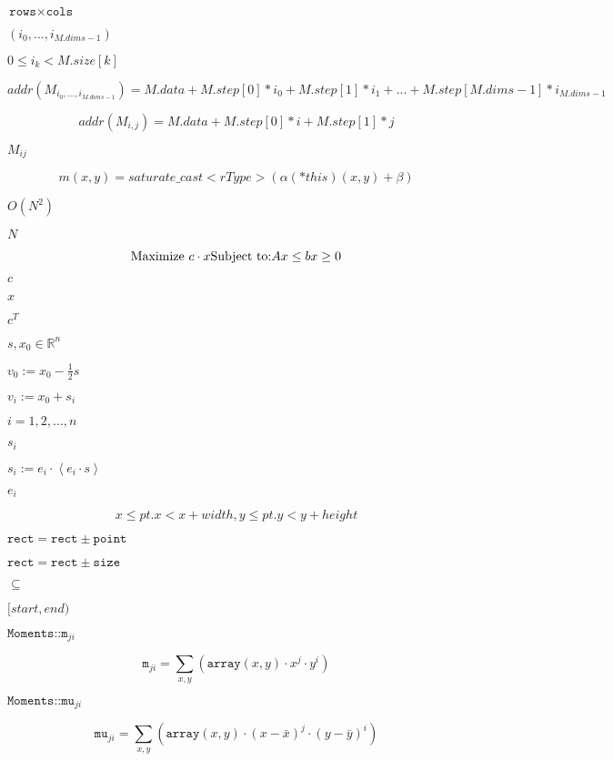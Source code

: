 \documentclass{article}
\begin{document}
$\texttt{rows} \times \texttt{cols}$
\pagebreak

$(i_0,...,i_{M.dims-1})$
\pagebreak

$0\leq i_k<M.size[k]$
\pagebreak

\[addr(M_{i_0,...,i_{M.dims-1}}) = M.data + M.step[0]*i_0 + M.step[1]*i_1 + ... + M.step[M.dims-1]*i_{M.dims-1}\]
\pagebreak

\[addr(M_{i,j}) = M.data + M.step[0]*i + M.step[1]*j\]
\pagebreak

$M_{ij}$
\pagebreak

\[m(x,y) = saturate \_ cast<rType>( \alpha (*this)(x,y) +  \beta )\]
\pagebreak

$O(N^2)$
\pagebreak

$N$
\pagebreak

\[\mbox{Maximize } c\cdot x\\
 \mbox{Subject to:}\\
 Ax\leq b\\
 x\geq 0\]
\pagebreak

$c$
\pagebreak

$x$
\pagebreak

$c^T$
\pagebreak

$s,x_0\in\mathbb{R}^n$
\pagebreak

$v_0:=x_0-\frac{1}{2} s$
\pagebreak

$v_i:=x_0+s_i$
\pagebreak

$i=1,2,\dots,n$
\pagebreak

$s_i$
\pagebreak

$s_i:=e_i\cdot\left<e_i\cdot s\right>$
\pagebreak

$e_i$
\pagebreak

\[x  \leq pt.x < x+width,
      y  \leq pt.y < y+height\]
\pagebreak

$\texttt{rect} = \texttt{rect} \pm \texttt{point}$
\pagebreak

$\texttt{rect} = \texttt{rect} \pm \texttt{size}$
\pagebreak

$\subseteq$
\pagebreak

$[start,end)$
\pagebreak

$\texttt{Moments::m}_{ji}$
\pagebreak

\[\texttt{m} _{ji}= \sum _{x,y}  \left ( \texttt{array} (x,y)  \cdot x^j  \cdot y^i \right )\]
\pagebreak

$\texttt{Moments::mu}_{ji}$
\pagebreak

\[\texttt{mu} _{ji}= \sum _{x,y}  \left ( \texttt{array} (x,y)  \cdot (x -  \bar{x} )^j  \cdot (y -  \bar{y} )^i \right )\]
\pagebreak
\end{document}
